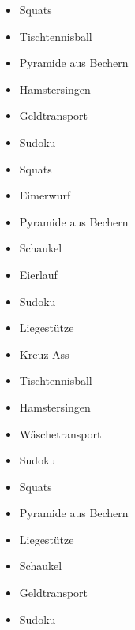 \begin{itemize}[label=$\bigcirc$]
    \item Squats
    \item Tischtennisball
    \item Pyramide aus Bechern
    \item Hamstersingen
    \item Geldtransport
    \item Sudoku
\end{itemize}
\newpage

\begin{itemize}[label=$\bigcirc$]
    \item Squats
    \item Eimerwurf
    \item Pyramide aus Bechern
    \item Schaukel
    \item Eierlauf
    \item Sudoku
\end{itemize}
\newpage

\begin{itemize}[label=$\bigcirc$]
    \item Liegestütze
    \item Kreuz-Ass
    \item Tischtennisball
    \item Hamstersingen
    \item Wäschetransport
    \item Sudoku
\end{itemize}
\newpage

\begin{itemize}[label=$\bigcirc$]
    \item Squats
    \item Pyramide aus Bechern
    \item Liegestütze
    \item Schaukel
    \item Geldtransport
    \item Sudoku
\end{itemize}
\newpage